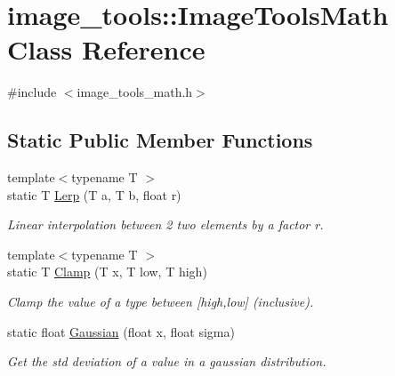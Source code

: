 \hypertarget{classimage__tools_1_1ImageToolsMath}{}\section{image\+\_\+tools\+:\+:Image\+Tools\+Math Class Reference}
\label{classimage__tools_1_1ImageToolsMath}


{\ttfamily \#include $<$image\+\_\+tools\+\_\+math.\+h$>$}

\subsection*{Static Public Member Functions}
\begin{DoxyCompactItemize}
\item 
\mbox{\label{classimage__tools_1_1ImageToolsMath_a3551d9e654b48b3c0720176f0b925f1e}} 
{\footnotesize template$<$typename T $>$ }\\static T \hyperlink{classimage__tools_1_1ImageToolsMath_a3551d9e654b48b3c0720176f0b925f1e}{Lerp} (T a, T b, float r)
\begin{DoxyCompactList}\small\item\em Linear interpolation between 2 two elements by a factor r. \end{DoxyCompactList}\item 
\mbox{\label{classimage__tools_1_1ImageToolsMath_a3b03e68d10aa6f63037fd57f1cb77e96}} 
{\footnotesize template$<$typename T $>$ }\\static T \hyperlink{classimage__tools_1_1ImageToolsMath_a3b03e68d10aa6f63037fd57f1cb77e96}{Clamp} (T x, T low, T high)
\begin{DoxyCompactList}\small\item\em Clamp the value of a type between \mbox{[}high,low\mbox{]} (inclusive). \end{DoxyCompactList}\item 
\mbox{\label{classimage__tools_1_1ImageToolsMath_aa0518f431a7fd7feb691f3d36151082f}} 
static float \hyperlink{classimage__tools_1_1ImageToolsMath_aa0518f431a7fd7feb691f3d36151082f}{Gaussian} (float x, float sigma)
\begin{DoxyCompactList}\small\item\em Get the std deviation of a value in a gaussian distribution. \end{DoxyCompactList}\end{DoxyCompactItemize}


